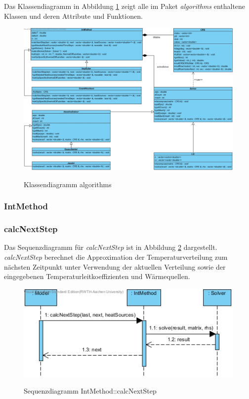Das Klassendiagramm in Abbildung \ref{Klassendiagramm algorithms} zeigt alle im Paket \emph{algorithms} enthaltene Klassen und deren Attribute und Funktionen.

\begin{figure}[H]
	\centering
	\hspace{-.2cm}
	\includegraphics[scale=.49]{Bilder/algorithms.jpg}\\
	\caption{Klassendiagramm algorithms}
	\label{Klassendiagramm algorithms}
\end{figure}
\newpage
\subsubsection{IntMethod}

\subsubsection*{calcNextStep}

Das Sequenzdiagramm für \emph{calcNextStep} ist in Abbildung \ref{Sequenzdiagramm IntMethod::calcNextStep} dargestellt. \emph{calcNextStep} berechnet die Approximation der Temperaturverteilung zum nächsten Zeitpunkt unter Verwendung der aktuellen Verteilung sowie der eingegebenen Temperaturleitkoeffizienten und Wärmequellen.

\begin{figure}[H]
	\centering
	\includegraphics[scale=.7]{Bilder/IntMethod__calcNextStep().jpg}\\
	\caption{Sequenzdiagramm IntMethod::calcNextStep}
	\label{Sequenzdiagramm IntMethod::calcNextStep}
\end{figure}

